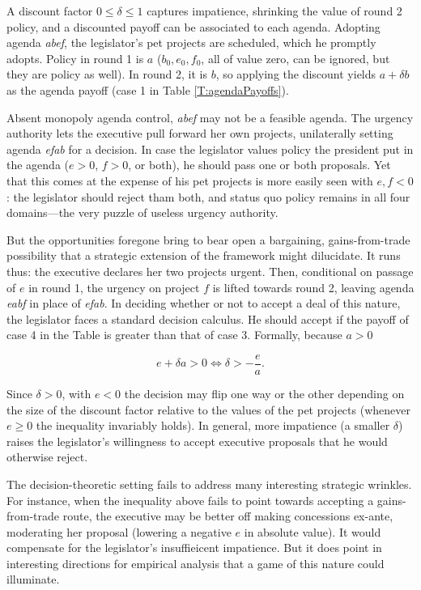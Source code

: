\documentclass[letter,12pt]{article}
\begin{document}
A discount factor $0\leq \delta \leq1$ captures impatience, shrinking the value of round 2 policy, and a discounted payoff can be associated to each agenda. Adopting agenda \emph{abef}, the legislator's pet projects are scheduled, which he promptly adopts. Policy in round 1 is $a$ ($b_0,e_0,f_0$, all of value zero, can be ignored, but they are policy as well). In round 2, it is $b$, so applying the discount yields $a + \delta b$ as the agenda payoff (case 1 in Table \ref{T:agendaPayoffs}). 

Absent monopoly agenda control, \emph{abef} may not be a feasible agenda. The urgency authority lets the executive pull forward her own projects, unilaterally setting agenda \emph{efab} for a decision. In case the legislator values policy the president put in the agenda ($e>0$, $f>0$, or both), he should pass one or both proposals. Yet that this comes at the expense of his pet projects is more easily seen with $e,f<0$: the legislator should reject tham both, and status quo policy remains in all four domains---the very puzzle of useless urgency authority. 

But the opportunities foregone bring to bear open a bargaining, gains-from-trade possibility that a strategic extension of the framework might dilucidate. It runs thus: the executive declares her two projects urgent. Then, conditional on passage of $e$ in round 1, the urgency on project $f$ is lifted towards round 2, leaving agenda \emph{eabf} in place of \emph{efab}. In deciding whether or not to accept a deal of this nature, the legislator faces a standard decision calculus. He should accept if the payoff of case 4 in the Table is greater than that of case 3. Formally, because $a>0$

\begin{equation*}
e + \delta a >  0 \iff \delta  >   -\frac{e}{a}.
\end{equation*}

\noindent Since $\delta>0$, with $e<0$ the decision may flip one way or the other depending on the size of the discount factor relative to the values of the pet projects (whenever $e\geq0$ the inequality invariably holds). In general, more impatience (a smaller $\delta$) raises the legislator's willingness to accept executive proposals that he would otherwise reject.  

The decision-theoretic setting fails to address many interesting strategic wrinkles. For instance, when the inequality above fails to point towards accepting a gains-from-trade route, the executive may be better off making concessions ex-ante, moderating her proposal (lowering a negative $e$ in absolute value). It would compensate for the legislator's insuffieicent impatience. But it does point in interesting directions for empirical analysis that a game of this nature could illuminate. 
\end{document}
